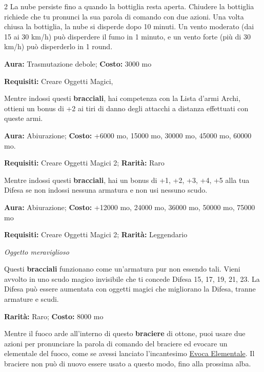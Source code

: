 \begin{multicols}{2}
La nube persiste fino a quando la bottiglia resta aperta. Chiudere la bottiglia richiede che tu pronunci la sua parola di comando con due azioni. Una volta chiusa la bottiglia, la nube si disperde dopo 10 minuti. Un vento moderato (dai 15 ai 30 km/h) può disperdere il fumo in 1 minuto, e un vento forte (più di 30 km/h) può disperderlo in 1 round.


\textbf{Aura:} Trasmutazione debole; \textbf{Costo:} 3000 mo

\textbf{Requisiti:} Creare Oggetti Magici,

Mentre indossi questi \textbf{bracciali}, hai competenza con la Lista d'armi Archi, ottieni un bonus di +2 ai tiri di danno degli attacchi a distanza effettuati con queste armi.


\textbf{Aura:} Abiurazione; \textbf{Costo:} +6000 mo, 15000 mo, 30000 mo, 45000 mo, 60000 mo.

\textbf{Requisiti:} Creare Oggetti Magici 2; \textbf{Rarità:} Raro

Mentre indossi questi \textbf{bracciali}, hai un bonus di +1, +2, +3, +4, +5 alla tua Difesa se non indossi nessuna armatura e non usi nessuno scudo.


\textbf{Aura:} Abiurazione;  \textbf{Costo:}  +12000 mo, 24000 mo, 36000 mo, 50000 mo, 75000 mo

\textbf{Requisiti:} Creare Oggetti Magici 2; \textbf{Rarità:} Leggendario

\emph{Oggetto meraviglioso}

Questi \textbf{bracciali} funzionano come un'armatura pur non essendo tali. Vieni avvolto in uno scudo magico invisibile che ti concede Difesa 15, 17, 19, 21, 23. La Difesa può essere aumentata con oggetti magici che migliorano la Difesa, tranne armature e scudi.


\textbf{Rarità:} Raro; \textbf{Costo:} 8000 mo

Mentre il fuoco arde all'interno di questo \textbf{braciere} di ottone, puoi usare due azioni per pronunciare la parola di comando del braciere ed evocare un elementale del fuoco, come se avessi lanciato l'incantesimo \hyperlink{Evoca Elementale}{Evoca Elementale}. Il braciere non può di nuovo essere usato a questo modo, fino alla prossima alba.


\end{multicols}
